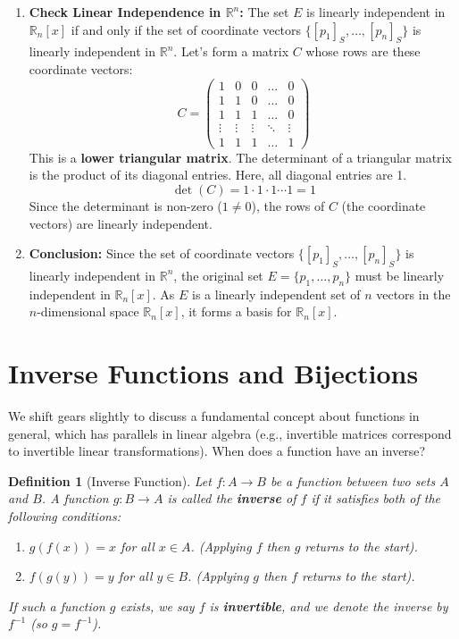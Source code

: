 \documentclass[11pt]{article}
\newtheorem{definition}[theorem]{Definition}
\theoremstyle{definition}
\theoremstyle{remark}
\newcommand{\R}{\mathbb{R}}
\newcommand{\mat}[1]{\begin{pmatrix}#1\end{pmatrix}}
\begin{document}
\begin{enumerate}
    \item \textbf{Check Linear Independence in $\R^n$:} The set $E$ is linearly independent in $\R_n[x]$ if and only if the set of coordinate vectors $\{[p_1]_S, \dots, [p_n]_S\}$ is linearly independent in $\R^n$. Let's form a matrix $C$ whose rows are these coordinate vectors:
    \[ C = \mat{
        1 & 0 & 0 & \dots & 0 \\
        1 & 1 & 0 & \dots & 0 \\
        1 & 1 & 1 & \dots & 0 \\
        \vdots & \vdots & \vdots & \ddots & \vdots \\
        1 & 1 & 1 & \dots & 1
        } \]
    This is a \textbf{lower triangular matrix}. The determinant of a triangular matrix is the product of its diagonal entries. Here, all diagonal entries are 1.
    \[ \det(C) = 1 \cdot 1 \cdot 1 \cdots 1 = 1 \]
    Since the determinant is non-zero ($1 \neq 0$), the rows of $C$ (the coordinate vectors) are linearly independent.

    \item \textbf{Conclusion:} Since the set of coordinate vectors $\{[p_1]_S, \dots, [p_n]_S\}$ is linearly independent in $\R^n$, the original set $E = \{p_1, \dots, p_n\}$ must be linearly independent in $\R_n[x]$. As $E$ is a linearly independent set of $n$ vectors in the $n$-dimensional space $\R_n[x]$, it forms a basis for $\R_n[x]$.
\end{enumerate} %

\section{Inverse Functions and Bijections}

We shift gears slightly to discuss a fundamental concept about functions in general, which has parallels in linear algebra (e.g., invertible matrices correspond to invertible linear transformations). When does a function have an inverse?

\begin{definition}[Inverse Function]
Let $f: A \to B$ be a function between two sets $A$ and $B$. A function $g: B \to A$ is called the \textbf{inverse} of $f$ if it satisfies both of the following conditions:
\begin{enumerate}
    \item $g(f(x)) = x$ for all $x \in A$. (Applying $f$ then $g$ returns to the start).
    \item $f(g(y)) = y$ for all $y \in B$. (Applying $g$ then $f$ returns to the start).
\end{enumerate}
If such a function $g$ exists, we say $f$ is \textbf{invertible}, and we denote the inverse by $f^{-1}$ (so $g = f^{-1}$).
\end{definition}
\end{document}
